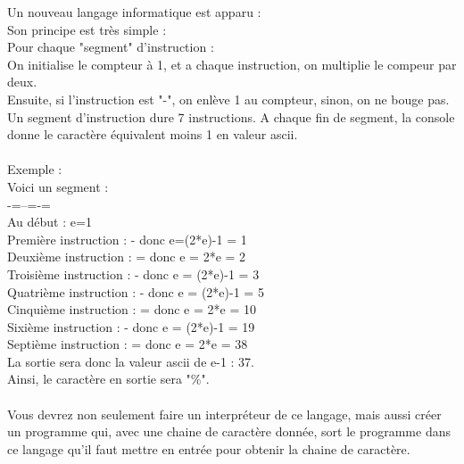 \documentclass[12pt]{article}
\begin{document}
Un nouveau langage informatique est apparu :\\
Son principe est très simple :\\
Pour chaque "segment" d'instruction :\\
On initialise le compteur à 1, et a chaque instruction, on multiplie le compeur par deux.\\
Ensuite, si l'instruction est "-", on enlève 1 au compteur, sinon, on ne bouge pas.\\
Un segment d'instruction dure 7 instructions. A chaque fin de segment, la console donne le caractère équivalent moins 1 en valeur ascii.
\\\\
Exemple :\\
Voici un segment :\\
-=--=-=\\
Au début : e=1\\
Première instruction : - donc e=(2*e)-1 = 1\\
Deuxième instruction : = donc e = 2*e = 2\\
Troisième instruction : - donc e = (2*e)-1 = 3\\
Quatrième instruction : - donc e = (2*e)-1 = 5\\
Cinquième instruction : = donc e = 2*e = 10\\
Sixième instruction : - donc e = (2*e)-1 = 19\\
Septième instruction : = donc e = 2*e = 38\\
La sortie sera donc la valeur ascii de e-1 : 37.\\
Ainsi, le caractère en sortie sera "\%".
\\\\
Vous devrez non seulement faire un interpréteur de ce langage, mais aussi créer un programme qui, avec une chaine de caractère donnée, sort le programme dans ce langage qu'il faut mettre en entrée pour obtenir la chaine de caractère.
\end{document}
